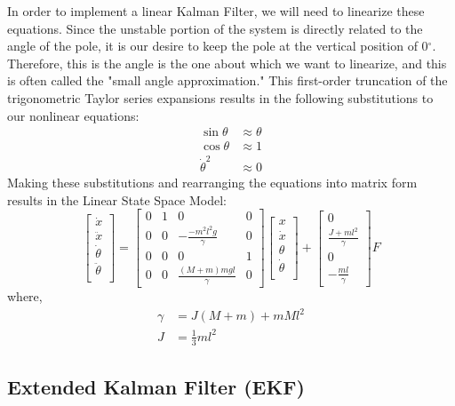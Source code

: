 \documentclass{article}
\begin{document}
In order to implement a linear Kalman Filter, we will need to linearize these equations. Since the unstable portion of the system is directly related to the angle of the pole, it is our desire to keep the pole at the vertical position of 0$^\circ$. Therefore, this is the angle is the one about which we want to linearize, and this is often called the "small angle approximation." This first-order truncation of the trigonometric Taylor series expansions results in the following substitutions to our nonlinear equations:
\begin{align*}
\sin \theta &\approx \theta \\
\cos \theta &\approx 1 \\
\dot{\theta}^2 &\approx 0
\end{align*}
Making these substitutions and rearranging the equations into matrix form results in the Linear State Space Model:
\begin{equation}
\begin{bmatrix}
	\dot{x} \\
	\ddot{x} \\
	\dot{\theta} \\
	\ddot{\theta} \\
\end{bmatrix} = \begin{bmatrix}
0 & 1 & 0 & 0 \\
0 & 0 & -\frac{-m^2l^2g}{\gamma} & 0 \\
0 & 0 & 0 & 1\\
0 & 0 & \frac{(M+m)mgl}{\gamma} & 0
\end{bmatrix} \begin{bmatrix}
	x \\
	\dot{x} \\
	\theta \\
	\dot{\theta} \\
\end{bmatrix}  + \begin{bmatrix}
0 \\
\frac{J+ml^2}{\gamma} \\
0 \\
-\frac{ml}{\gamma}
\end{bmatrix} F
\label{eq:ss_continuous}
\end{equation}
where,
\begin{align*}
\gamma &= J(M+m)+mMl^2 \\
J &= \frac{1}{3}ml^2
\end{align*}

\subsection{Extended Kalman Filter (EKF)}
\end{document}
